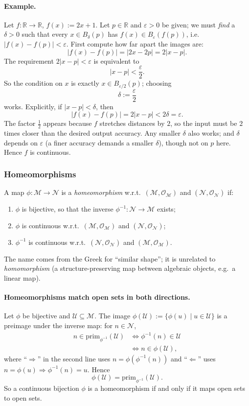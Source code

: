 \documentclass[11pt]{article}
\newcommand{\prim}[1]{\mathrm{prim}_{#1}}
\begin{document}
\paragraph{Example.} Let $f:\mathbb R\to\mathbb R$, $f(x):=2x+1$. Let $p\in\mathbb R$ and $\varepsilon>0$ be given; we must \emph{find} a $\delta>0$ such that every $x\in B_\delta(p)$ has $f(x)\in B_\varepsilon(f(p))$, i.e.\ $|f(x)-f(p)|<\varepsilon$. First compute how far apart the images are:
\[
|f(x)-f(p)|=|2x-2p|=2|x-p|.
\]
The requirement $2|x-p|<\varepsilon$ is equivalent to
\[
|x-p|<\frac{\varepsilon}{2}.
\]
So the condition on $x$ is exactly $x\in B_{\varepsilon/2}(p)$; choosing
\[
\delta:=\frac{\varepsilon}{2}
\]
works. Explicitly, if $|x-p|<\delta$, then
\[
|f(x)-f(p)|=2|x-p|<2\delta=\varepsilon.
\]
The factor $\tfrac12$ appears because $f$ stretches distances by $2$, so the input must be $2$ times closer than the desired output accuracy. Any smaller $\delta$ also works; and $\delta$ depends on $\varepsilon$ (a finer accuracy demands a smaller $\delta$), though not on $p$ here. Hence $f$ is continuous.

\subsubsection*{Homeomorphisms}
A map $\phi:\mathcal M\to\mathcal N$ is a \emph{homeomorphism} w.r.t.\ $(\mathcal M,\mathcal O_{\mathcal M})$ and $(\mathcal N,\mathcal O_{\mathcal N})$ if:
\begin{enumerate}[label=(\arabic*)]
  \item $\phi$ is bijective, so that the inverse $\phi^{-1}:\mathcal N\to\mathcal M$ exists;
  \item $\phi$ is continuous w.r.t.\ $(\mathcal M,\mathcal O_{\mathcal M})$ and $(\mathcal N,\mathcal O_{\mathcal N})$;
  \item $\phi^{-1}$ is continuous w.r.t.\ $(\mathcal N,\mathcal O_{\mathcal N})$ and $(\mathcal M,\mathcal O_{\mathcal M})$.
\end{enumerate}
The name comes from the Greek for ``similar shape''; it is unrelated to \emph{homomorphism} (a structure-preserving map between algebraic objects, e.g.\ a linear map).

\paragraph{Homeomorphisms match open sets in both directions.} Let $\phi$ be bijective and $\mathcal U\subseteq\mathcal M$. The image $\phi(\mathcal U):=\{\phi(u)\mid u\in\mathcal U\}$ is a preimage under the inverse map: for $n\in\mathcal N$,
\begin{align*}
n\in\prim{\phi^{-1}}(\mathcal U)
&\iff \phi^{-1}(n)\in\mathcal U\\
&\iff n\in\phi(\mathcal U),
\end{align*}
where ``$\Rightarrow$'' in the second line uses $n=\phi(\phi^{-1}(n))$ and ``$\Leftarrow$'' uses $n=\phi(u)\Rightarrow\phi^{-1}(n)=u$. Hence
\[
\phi(\mathcal U)=\prim{\phi^{-1}}(\mathcal U).
\]
So a continuous bijection $\phi$ is a homeomorphism if and only if it maps open sets to open sets.
\end{document}
